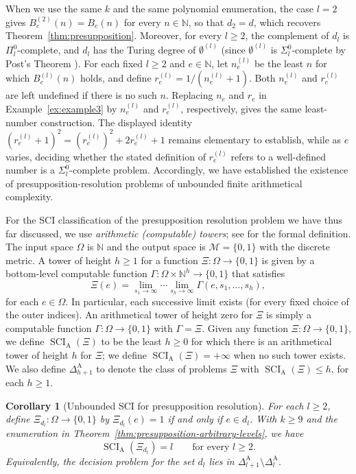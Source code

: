 \documentclass[10pt, a4paper, reqno]{amsart}
\numberwithin{equation}{section}
\renewcommand{\geq}{\geqslant}
\renewcommand{\leq}{\leqslant}
\newcommand{\SCI}{\operatorname{SCI}}
\newtheorem{corollary}[theorem]{Corollary}
\theoremstyle{definition}
\theoremstyle{definition}
\begin{document}
When we use the same $k$ and the same polynomial enumeration,  the case $l=2$ gives $B_{e}^{(2)}(n) = B_e(n)$ for every $n \in \mathbb{N}$, so that $d_2 = d$, which recovers Theorem~\ref{thm:presupposition}.
Moreover, for every $l\geq2$, the complement of $d_l$ is
$\Pi_{l}^{0}$-complete, and $d_l$ has the Turing degree of $\emptyset^{(l)}$ (since $\emptyset^{(l)}$ is $\Sigma_{l}^{0}$-complete by Post's Theorem \cite{Soare2016}).
For each fixed $l\geq2$ and $e \in \mathbb{N}$, let $n^{(l)}_e$ be the least $n$ for which $B^{(l)}_e(n)$ holds, and define $r^{(l)}_e =1/(n^{(l)}_e+1)$.
Both $n^{(l)}_e$ and $r^{(l)}_e$ are left undefined if there is no such $n$.
Replacing $n_e$ and $r_e$ in Example~\ref{ex:example3} by $n^{(l)}_e$ and $r^{(l)}_e$, respectively, gives the same
least-number construction. The displayed identity
$(r^{(l)}_e+1)^2=(r^{(l)}_e)^2+2r^{(l)}_e+1$ remains elementary to establish, while as $e$ varies, deciding whether the stated definition of $r^{(l)}_e$ refers to a well-defined number is a $\Sigma^0_l$-complete problem. Accordingly, we have established the existence of presupposition-resolution problems of
unbounded finite arithmetical complexity.

For the SCI classification of the presupposition resolution problem we have thus far discussed, we use \emph{arithmetic (computable) towers}; see \cite[Definitions~5.2--5.6]{colbrook2019foundations} for the formal definition.
The input space $\Omega$ is $\mathbb N$ and the output space is $\mathcal{M} = \{0,1\}$ with the discrete metric. A tower of height $h \geq 1$ for a function $\Xi : \Omega \to \{0, 1\}$ is given by a bottom-level computable function $\Gamma : \Omega \times \mathbb{N}^h \to \{0, 1\}$ that satisfies
\[
    \Xi(e)=\lim_{s_1\to\infty}\cdots\lim_{s_h\to\infty}
    \Gamma(e,s_1,\ldots,s_h),
\]
for each $e \in \Omega$. In particular, each successive limit exists (for every fixed choice of the outer indices). An arithmetical tower of height zero for $\Xi$ is simply a computable function $\Gamma : \Omega \to \{0,1\}$ with $\Gamma = \Xi$. Given any function $\Xi : \Omega \to \{0, 1\}$, we define $\SCI_{\mathrm A}(\Xi)$ to be the least $h \geq 0$ for which there is an arithmetical tower of height $h$ for $\Xi$; we define $\SCI_{\mathrm A}(\Xi) = +\infty$ when no such tower exists. We also define $\Delta^{\mathrm A}_{h+1}$ to denote the class of problems $\Xi$ with $\SCI_{\mathrm A}(\Xi) \leq h$, for each $h \geq 1$.


\begin{corollary}[Unbounded SCI for presupposition resolution]
\label{cor:presupposition-sci}
For each $l\geq2$, define $\Xi_{d_l} : \Omega \to \{0, 1\}$ by $\Xi_{d_l}(e) = 1$ if and only if $e \in d_l$. With $k\geq9$ and the enumeration in Theorem~\ref{thm:presupposition-arbitrary-levels}, we have
\[
    \SCI_{\mathrm A}(\Xi_{d_l})=l
    \qquad\text{for every }l\geq2.
\]
Equivalently, the decision problem for the set $d_l$ lies in
$\Delta^{\mathrm A}_{l+1}\setminus\Delta^{\mathrm A}_l$.
\end{corollary}
\end{document}

